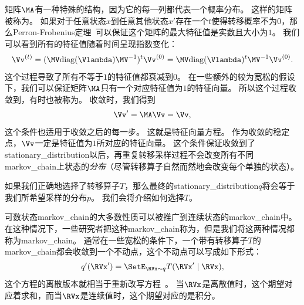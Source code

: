 矩阵$\MA$有一种特殊的结构，因为它的每一列都代表一个概率分布。
这样的矩阵被称为。
如果对于任意状态$x$到任意其他状态$x'$存在一个$t$使得转移概率不为$0$，那么Perron-Frobenius定理~\citep{Perron-1907,Frobenius-1908}可以保证这个矩阵的最大特征值是实数且大小为$1$。
我们可以看到所有的特征值随着时间呈现指数变化： 
\begin{align}
\Vv^{(t)} = (\MV \text{diag}(\Vlambda)\MV^{-1})^{t} \Vv^{(0)} = \MV \text{diag}(\Vlambda)^t \MV^{-1} \Vv^{(0)}.
\end{align}
这个过程导致了所有不等于$1$的特征值都衰减到$0$。  
在一些额外的较为宽松的假设下，我们可以保证矩阵$\MA$只有一个对应特征值为$1$的特征向量。  
所以这个过程收敛到，有时也被称为。 
收敛时，我们得到 
\begin{align}
\label{eqn:1723}
\Vv ' = \MA \Vv = \Vv,
\end{align}
这个条件也适用于收敛之后的每一步。
这就是特征向量方程。
作为收敛的稳定点，$\Vv$一定是特征值为$1$所对应的特征向量。 
这个条件保证收敛到了\gls{stationary_distribution}以后，再重复转移采样过程不会改变所有不同\gls{markov_chain}上状态的\emph{分布}（尽管转移算子自然而然地会改变每个单独的状态）。  


如果我们正确地选择了转移算子$T$，那么最终的\gls{stationary_distribution}$q$将会等于我们所希望采样的分布$p$。  
我们会将介绍如何选择$T$。 


可数状态\gls{markov_chain}的大多数性质可以被推广到连续状态的\gls{markov_chain}中。 
在这种情况下，一些研究者把这种\gls{markov_chain}称为，但是我们将这两种情况都称为\gls{markov_chain}。
通常在一些宽松的条件下，一个带有转移算子$T$的\gls{markov_chain}都会收敛到一个不动点，这个不动点可以写成如下形式：
\begin{align}
q' (\RVx') = \SetE_{\RVx\sim q}T(\RVx'\mid \RVx),
\end{align}
这个方程的离散版本就相当于重新改写方程~。
当$\RVx$是离散值时，这个期望对应着求和，而当$\RVx$是连续值时，这个期望对应的是积分。 


